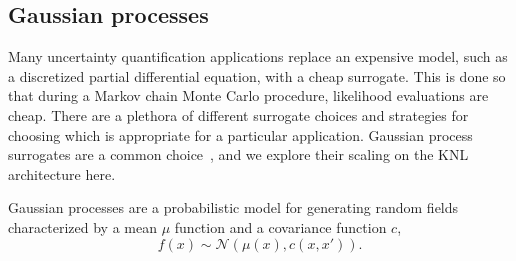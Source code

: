 \subsection{Gaussian processes}
\label{sec:chol}

Many uncertainty quantification applications replace an expensive model, such
as a discretized partial differential equation, with a cheap surrogate.  This
is done so that during a Markov chain Monte Carlo procedure, likelihood
evaluations are cheap.  There are a plethora of different surrogate choices and
strategies for choosing which is appropriate for a particular application.
Gaussian process surrogates are a common choice~\cite{rasmussen2006gaussian,
higdon2008computer,oakley_hagan_2002,conti2010bayesian,conti2009gaussian,bayarri2009using},
and we explore their scaling on the KNL architecture here.

Gaussian processes are a probabilistic model for generating random fields
characterized by a mean $\mu$ function and a covariance function $c$,
\begin{equation}
  f(x) \sim \mathcal{N}(\mu(x), c(x, x')).
\end{equation}

